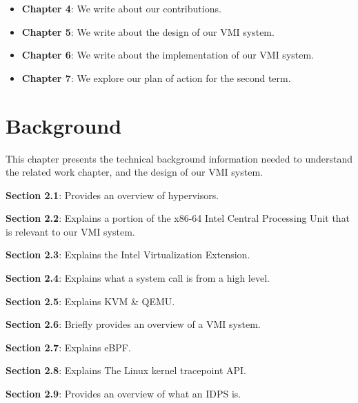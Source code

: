 \documentclass{report}
\begin{document}
\begin{spacing}{1.5}
{\begin{itemize}
    \item \textbf{Chapter 4}: We write about our contributions.

    \item \textbf{Chapter 5}: We write about the design of our VMI system.
    
    \item \textbf{Chapter 6}: We write about the implementation of our VMI system.
    
    
    \item \textbf{Chapter 7}: We explore our plan of action for the second term.
    
    \leavevmode\newline
\end{itemize}
}






















\chapter{Background}

{\large
This chapter presents the technical background information needed to understand the related work chapter, and the design of our VMI system.
\newline
}


\begin{itemize}
{\large
\item \textbf{Section 2.1}: Provides an overview of hypervisors. 
\item \textbf{Section 2.2}: Explains a portion of the x86-64 Intel Central Processing Unit that is relevant to our VMI system. 
\item \textbf{Section 2.3}: Explains the Intel Virtualization Extension. 
\item \textbf{Section 2.4}: Explains what a system call is from a high level. 
\item \textbf{Section 2.5}: Explains KVM \& QEMU. 
\item \textbf{Section 2.6}: Briefly provides an overview of a VMI system.
\item \textbf{Section 2.7}: Explains eBPF.
\item \textbf{Section 2.8}: Explains The Linux kernel tracepoint API.
\item \textbf{Section 2.9}: Provides an overview of what an IDPS is. 
\newline
}
\end{itemize}









\end{spacing}
\end{document}
